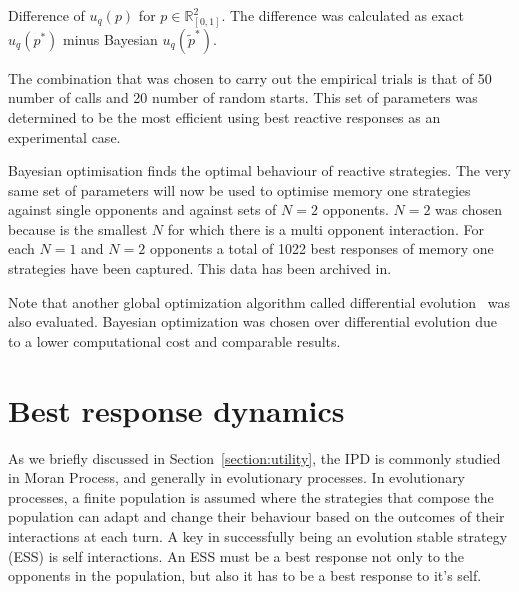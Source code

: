 \documentclass[10pt]{article}
\newcommand{\R}{\mathbb{R}}
\begin{document}
\begin{table}[htbp]
    \begin{center}
    
    \caption{Difference of \(u_q(p)\) for \(p \in \R_{[0, 1]} ^ 2\). The difference was
    calculated as exact \(u_q(p ^ *)\) minus Bayesian \(u_q(\tilde{p} ^ *)\).}
    \label{table:bayesian_excact_difference}
    \end{center}
\end{table}

The combination that was chosen to carry out the empirical trials is that
of 50 number of calls and 20 number of random starts. This set of parameters
was determined to be the most efficient using best reactive responses as an experimental
case.


Bayesian optimisation finds the optimal
behaviour of reactive strategies. The very same set of parameters will now be
used to optimise
memory one strategies against single opponents and against
sets of \(N=2\) opponents. \(N=2\) was chosen because is the smallest \(N\) for
which there is a multi opponent interaction. For each \(N=1\) and \(N=2\) opponents a
total of 1022 best responses of memory one strategies have been captured. This data has
been archived in.

Note that another global optimization algorithm called differential evolution~\cite{Storn1997}
was also evaluated. Bayesian optimization was
chosen over differential evolution due to a lower computational cost and
comparable results.


\section{Best response dynamics}

As we briefly discussed in Section~\ref{section:utility}, the IPD is commonly
studied in Moran Process, and generally in evolutionary processes. In
evolutionary processes, a finite population is assumed where the strategies that
compose the population can adapt and change their behaviour based on the
outcomes of their interactions at each turn. A key in successfully being an
evolution stable strategy (ESS) is self interactions. An ESS must be a best
response not only to the opponents in the population, but also it has to be a
best response to it's self.
\end{document}
